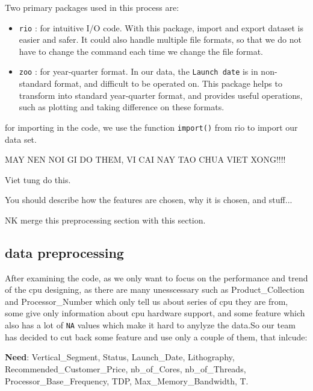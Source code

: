 Two primary packages used in this process are:

\begin{itemize}
    \item \verb|rio| : for intuitive I/O code.
    With this package, import and export dataset is easier and safer. It could also handle multiple file formats, so that we do not have to
    change the command each time we change the file format.

    \item \verb|zoo| : for year-quarter format.
    In our data, the \verb|Launch date| is in non-standard format, and difficult to be operated on. This package helps to transform
    into standard year-quarter format, and provides useful operations, such as plotting and taking difference on these formats.

\end{itemize}


for importing in the code, we use the function \texttt{import()} from rio to import our data set.


MAY NEN NOI GI DO THEM, VI CAI NAY TAO CHUA VIET XONG!!!!

Viet tung do this.

You should describe how the features are chosen, why it is chosen, and stuff...

NK merge this preprocessing section with this section.
\subsection{data preprocessing}

After examining the code, as we only want to focus on the performance and trend of the cpu designing, as there are many unesscessary such as Product\_Collection and Processor\_Number which only tell us about series of cpu they are from, some give only information about cpu hardware support, and some feature which also has a lot of \texttt{NA} values which make it hard to anylyze the data.So our team has decided to cut back some feature and use only a couple of them, that inlcude:

\textbf{Need}: Vertical\_Segment, Status, Launch\_Date, Lithography, Recommended\_Customer\_Price, nb\_of\_Cores, nb\_of\_Threads, Processor\_Base\_Frequency, TDP, Max\_Memory\_Bandwidth, T.

